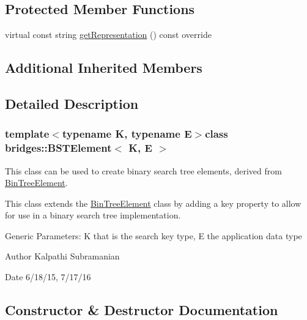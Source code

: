 \subsection*{Protected Member Functions}
\begin{DoxyCompactItemize}
\item 
virtual const string \hyperlink{classbridges_1_1_b_s_t_element_adc7e6fbdbad566308374995920054b6e}{get\+Representation} () const  override
\end{DoxyCompactItemize}
\subsection*{Additional Inherited Members}


\subsection{Detailed Description}
\subsubsection*{template$<$typename K, typename E$>$class bridges\+::\+B\+S\+T\+Element$<$ K, E $>$}

This class can be used to create binary search tree elements, derived from \hyperlink{classbridges_1_1_bin_tree_element}{Bin\+Tree\+Element}. 

This class extends the \hyperlink{classbridges_1_1_bin_tree_element}{Bin\+Tree\+Element} class by adding a key property to allow for use in a binary search tree implementation.

Generic Parameters\+: K that is the search key type, E the application data type

\begin{DoxyAuthor}{Author}
Kalpathi Subramanian 
\end{DoxyAuthor}
\begin{DoxyDate}{Date}
6/18/15, 7/17/16 
\end{DoxyDate}


\subsection{Constructor \& Destructor Documentation}
\hypertarget{classbridges_1_1_b_s_t_element_aff7dbbb4011e85ea492d9a0c921895c5}{}
